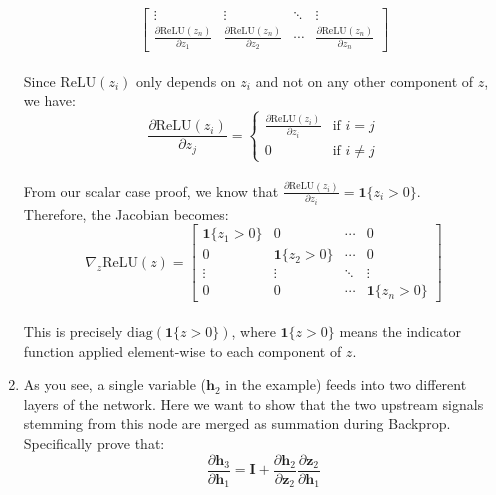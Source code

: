 \begin{enumerate}
{$$\begin{bmatrix}
\vdots & \vdots & \ddots & \vdots \\
\frac{\partial \text{ReLU}(z_n)}{\partial z_1} & \frac{\partial \text{ReLU}(z_n)}{\partial z_2} & \cdots & \frac{\partial \text{ReLU}(z_n)}{\partial z_n}
\end{bmatrix}$$ \\
Since $\text{ReLU}(z_i)$ only depends on $z_i$ and not on any other component of $z$, we have: \\
$$\frac{\partial \text{ReLU}(z_i)}{\partial z_j} = 
\begin{cases}
\frac{\partial \text{ReLU}(z_i)}{\partial z_i} & \text{if } i = j \\
0 & \text{if } i \neq j
\end{cases}$$ \\
From our scalar case proof, we know that $\frac{\partial \text{ReLU}(z_i)}{\partial z_i} = \mathbf{1}\{z_i > 0\}$. \\
Therefore, the Jacobian becomes: \\
$$\nabla_z \text{ReLU}(z) = 
\begin{bmatrix}
\mathbf{1}\{z_1 > 0\} & 0 & \cdots & 0 \\
0 & \mathbf{1}\{z_2 > 0\} & \cdots & 0 \\
\vdots & \vdots & \ddots & \vdots \\
0 & 0 & \cdots & \mathbf{1}\{z_n > 0\}
\end{bmatrix}$$ \\
This is precisely $\text{diag}(\mathbf{1}\{z > 0\})$, where $\mathbf{1}\{z > 0\}$ means the indicator function applied element-wise to each component of $z$.}

    \item As you see, a single variable ($\mathbf{h}_2$ in the example) feeds into two different layers of the network. Here we want to show that the two upstream signals stemming from this node are merged as summation  during Backprop. Specifically prove that: 
    $$
    \frac{\partial \mathbf{h}_3}{\partial \mathbf{h}_1 } = \textbf{I} + \frac{\partial \mathbf{h}_2}{\partial \mathbf{z}_2 } \frac{\partial \mathbf{z}_2}{\partial \mathbf{h}_1 } 
    $$


\end{enumerate}
